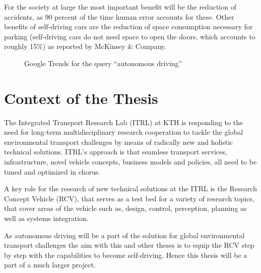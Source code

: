 For the society at large the most important benefit will be the reduction of accidents, as 90 percent of the time human error accounts for these. Other benefits of self-driving cars are the reduction of space consumption necessary for parking (self-driving cars do not need space to open the doors, which accounts to roughly 15\%) as reported by McKinsey \& Company. \cite{Bertoncello.2015}

\begin{figure}[h]
\caption{Google Trends for the query ``autonomous driving''}
\label{fig:googleTrends}
\end{figure}

\section{Context of the Thesis}
The Integrated Transport Research Lab (ITRL) at KTH is responding to the need for long-term multidisciplinary research cooperation to tackle the global environmental transport challenges by means of radically new and holistic technical solutions. ITRL's approach is that seamless transport services, infrastructure, novel vehicle concepts, business models and policies, all need to be tuned and optimized in chorus.

A key role for the research of new technical solutions at the ITRL is the Research Concept Vehicle (RCV), that serves as a test bed for a variety of research topics, that cover areas of the vehicle such as, design, control, perception, planning as well as systems integration.

As autonomous driving will be a part of the solution for global environmental transport challenges the aim with this and other theses is to equip the RCV step by step with the capabilities to become self-driving. Hence this thesis will be a part of a much larger project.

